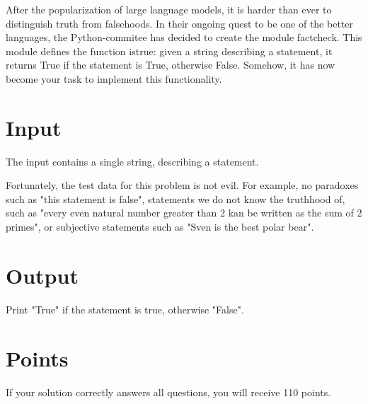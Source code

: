 \noindent

After the popularization of large language models, it is harder than ever to distinguish
truth from falsehoods. In their ongoing quest to be one of the better languages,
the Python-commitee has decided to create the module factcheck. This module defines
the function istrue: given a string describing a statement, it returns True if the
statement is True, otherwise False. Somehow, it has now become your task to implement
this functionality.

\section*{Input}
\noindent
The input contains a single string, describing a statement.

Fortunately, the test data for this problem is not evil. For example, no paradoxes such as
"this statement is false", statements we do not know the truthhood of, such as "every even
natural number greater than 2 kan be written as the sum of 2 primes", or subjective statements
such as "Sven is the best polar bear".

\section*{Output}
\noindent
Print "True" if the statement is true, otherwise "False".

\section*{Points}
If your solution correctly answers all questions, you will receive 110 points.
